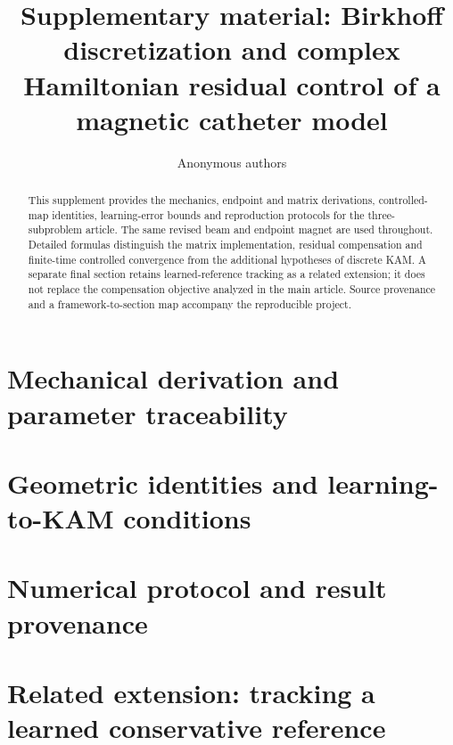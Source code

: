 \documentclass[doublespace,Afour,sageh,times]{sagej}
\begin{document}
\title{Supplementary material: Birkhoff discretization and complex Hamiltonian residual control of a magnetic catheter model}
\author{Anonymous authors}
\begin{abstract}
This supplement provides the mechanics, endpoint and matrix derivations, controlled-map identities, learning-error bounds and reproduction protocols for the three-subproblem article. The same revised beam and endpoint magnet are used throughout. Detailed formulas distinguish the matrix implementation, residual compensation and finite-time controlled convergence from the additional hypotheses of discrete KAM. A separate final section retains learned-reference tracking as a related extension; it does not replace the compensation objective analyzed in the main article. Source provenance and a framework-to-section map accompany the reproducible project.
\end{abstract}
\maketitle
\raggedbottom
\section{Mechanical derivation and parameter traceability}\label{sec:supp-mechanics}

\section{Geometric identities and learning-to-KAM conditions}\label{sec:supp-structure}

\section{Numerical protocol and result provenance}\label{sec:supp-experiments}

\section{Related extension: tracking a learned conservative reference}\label{sec:supp-tracking}


\clearpage

\end{document}
